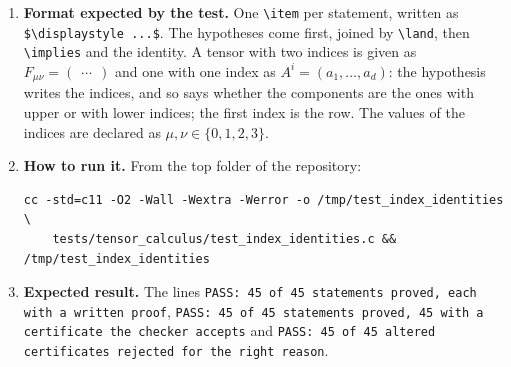 \documentclass[11pt,a4paper]{article}
\begin{document}
\begin{enumerate}
\item \textbf{Format expected by the test.} One \texttt{\textbackslash item} per statement, written as \texttt{\$\textbackslash displaystyle ...\$}. The hypotheses come first, joined by \texttt{\textbackslash land}, then \texttt{\textbackslash implies} and the identity. A tensor with two indices is given as $F_{\mu\nu} = \begin{pmatrix} \dots \end{pmatrix}$ and one with one index as $A^{i} = (a_1, \dots, a_d)$: the hypothesis writes the indices, and so says whether the components are the ones with upper or with lower indices; the first index is the row. The values of the indices are declared as $\mu, \nu \in \{0, 1, 2, 3\}$.

\item \textbf{How to run it.} From the top folder of the repository:
\begin{verbatim}
cc -std=c11 -O2 -Wall -Wextra -Werror -o /tmp/test_index_identities \
    tests/tensor_calculus/test_index_identities.c && /tmp/test_index_identities
\end{verbatim}

\item \textbf{Expected result.} The lines \texttt{PASS: 45 of 45 statements proved, each with a written proof}, \texttt{PASS: 45 of 45 statements proved, 45 with a certificate the checker accepts} and \texttt{PASS: 45 of 45 altered certificates rejected for the right reason}.

\end{enumerate}
\end{document}
